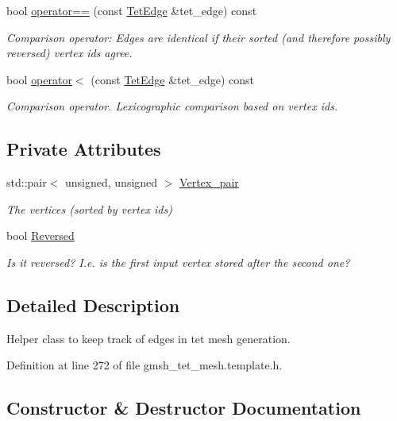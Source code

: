 \begin{DoxyCompactItemize}
bool \hyperlink{classoomph_1_1TetEdge_a07cbad9bf3e951fcdfab23575c42e379}{operator==} (const \hyperlink{classoomph_1_1TetEdge}{Tet\+Edge} \&tet\+\_\+edge) const
\begin{DoxyCompactList}\small\item\em Comparison operator\+: Edges are identical if their sorted (and therefore possibly reversed) vertex ids agree. \end{DoxyCompactList}\item 
bool \hyperlink{classoomph_1_1TetEdge_ac8d4b17db0a1e741664d8029ffb419b9}{operator$<$} (const \hyperlink{classoomph_1_1TetEdge}{Tet\+Edge} \&tet\+\_\+edge) const
\begin{DoxyCompactList}\small\item\em Comparison operator. Lexicographic comparison based on vertex ids. \end{DoxyCompactList}\end{DoxyCompactItemize}
\subsection*{Private Attributes}
\begin{DoxyCompactItemize}
\item 
std\+::pair$<$ unsigned, unsigned $>$ \hyperlink{classoomph_1_1TetEdge_a6dc6e07e15c5ffd5a2d7c162f4322eef}{Vertex\+\_\+pair}
\begin{DoxyCompactList}\small\item\em The vertices (sorted by vertex ids) \end{DoxyCompactList}\item 
bool \hyperlink{classoomph_1_1TetEdge_ad2832c145c84cf2655a2c02a8e86a4fa}{Reversed}
\begin{DoxyCompactList}\small\item\em Is it reversed? I.\+e. is the first input vertex stored after the second one? \end{DoxyCompactList}\end{DoxyCompactItemize}


\subsection{Detailed Description}
Helper class to keep track of edges in tet mesh generation. 

Definition at line 272 of file gmsh\+\_\+tet\+\_\+mesh.\+template.\+h.



\subsection{Constructor \& Destructor Documentation}
\mbox{\label{classoomph_1_1TetEdge_aa50127a0f255985cced5d90ec2325c0c}} 
